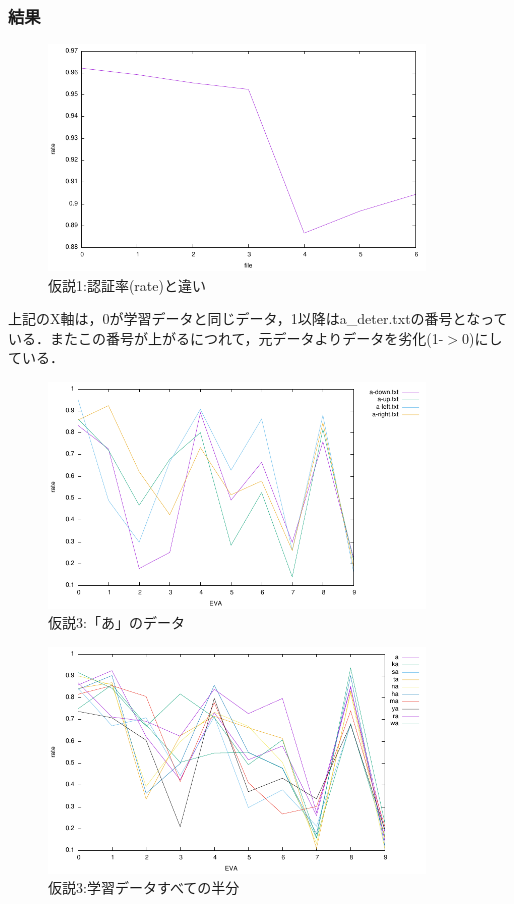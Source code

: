 \subsubsection{結果}
\begin{figure}[h]
 \begin{center}
  \includegraphics[width=10.0cm]{figs/level3/deter.pdf}
  \caption{仮説1:認証率(rate)と違い}
  \label{fig:level3_3_1}
 \end{center}
\end{figure}
上記のX軸は，0が学習データと同じデータ，1以降はa\_deter.txtの番号となっている．またこの番号が上がるにつれて，元データよりデータを劣化(1-$>$0)にしている．

\begin{figure}[h]
 \begin{center}
  \includegraphics[width=10.0cm]{figs/level3/adata.pdf}
  \caption{仮説3:「あ」のデータ}
  \label{fig:level3_3_2}
 \end{center}
\end{figure}

\begin{figure}[h]
 \begin{center}
  \includegraphics[width=10.0cm]{figs/level3/mozi.pdf}
  \caption{仮説3:学習データすべての半分}
  \label{fig:level3_3_3}
 \end{center}
\end{figure}

